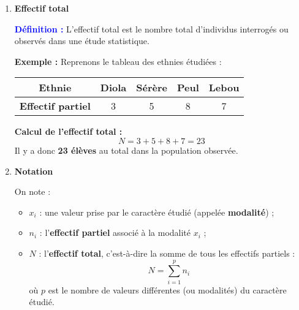 \documentclass[a4paper,12pt]{article}
\begin{document}
\begin{enumerate}[leftmargin=1.5cm, label=\textbf{\arabic*)}]
\vspace{0.2cm}

\begin{tcolorbox}[colback=green!5!white, colframe=green!60!black, boxrule=0.5pt]
\end{tcolorbox}

\item \textbf{Effectif total} \\

\begin{tcolorbox}[colback=red!5!white, colframe=red!60!black, boxrule=0.5pt]
    \textcolor{blue}{\textbf{Définition :}} 
    L’effectif total est le nombre total d’individus interrogés ou observés dans une étude statistique.
\end{tcolorbox}

\vspace{0.2cm}

\textbf{Exemple :} Reprenons le tableau des ethnies étudiées :

\vspace{0.3cm}
\begin{center}
\begin{tabular}{|c|c|c|c|c|}
    \hline
    \textbf{Ethnie} & Diola & Sérère & Peul & Lebou \\
    \hline
    \textbf{Effectif partiel} & 3 & 5 & 8 & 7 \\
    \hline
\end{tabular}
\end{center}

\vspace{0.4cm}

\begin{tcolorbox}[colback=blue!5!white, colframe=blue!60!black, boxrule=0.5pt]
\textbf{Calcul de l’effectif total :} \\
\[
N = 3 + 5 + 8 + 7 = 23
\]
Il y a donc \textbf{23 élèves} au total dans la population observée.
\end{tcolorbox}

\item \textbf{Notation} \\

\begin{tcolorbox}[colback=red!5!white, colframe=red!60!black, boxrule=0.5pt]
On note :
\begin{itemize}
    \item \( x_i \) : une valeur prise par le caractère étudié (appelée \textbf{modalité}) ;
    \item \( n_i \) : l’\textbf{effectif partiel} associé à la modalité \( x_i \) ;
    \item \( N \) : l’\textbf{effectif total}, c’est-à-dire la somme de tous les effectifs partiels :
    \[
    N = \sum_{i=1}^{p} n_i
    \]
    où \( p \) est le nombre de valeurs différentes (ou modalités) du caractère étudié.
\end{itemize}
\end{tcolorbox}


\end{enumerate}
\end{document}
